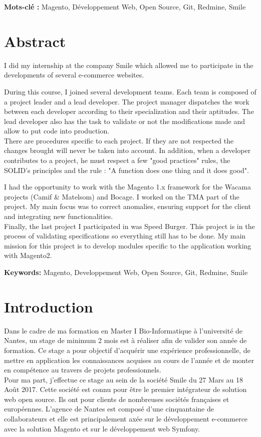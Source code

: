 \documentclass[12pt, a4paper, twoside]{report}
\newcommand{\mychapter}[2]{
	\setcounter{chapter}{#1}
	\setcounter{section}{0}
	\chapter*{#2}
	\addcontentsline{toc}{chapter}{#2}
}
\begin{document}
\textbf{Mots-clé :} Magento, Développement Web, Open Source, Git, Redmine, Smile

\mychapter{-3}{Abstract}

I did my internship at the company Smile which allowed me to participate in the developments of several e-commerce websites. \vspace{0.1cm}

During this course, I joined several development teams. Each team is composed of a project leader and a lead developer. The project manager dispatches the work between each developer according to their specialization and their aptitudes. The lead developer also has the task to validate or not the modifications made and allow to put code into production. \\
There are procedures specific to each project. If they are not respected the changes brought will never be taken into account. In addition, when a developer contributes to a project, he must respect a few "good practices" rules, the SOLID's principles and the rule : "A function does one thing and it does good". \vspace{0.1cm}

I had the opportunity to work with the Magento 1.x framework for the Wacama projects (Camif \& Matelsom) and Bocage. I worked on the TMA part of the project. My main focus was to correct anomalies, ensuring support for the client and integrating new functionalities. \\

Finally, the last project I participated in was Speed Burger. This project is in the process of validating specifications so everything still has to be done. My main mission for this project is to develop modules specific to the application working with Magento2. \vspace{0.1cm}

\textbf{Keywords:} Magento, Developpement Web, Open Source, Git, Redmine, Smile

\mychapter{-2}{Introduction}

Dans le cadre de ma formation en Master I Bio-Informatique à l'université de Nantes, un stage de minimum 2 mois est à réaliser afin de valider son année de formation. Ce stage a pour objectif d'acquérir une expérience professionnelle, de mettre en application les connaissances acquises au cours de l'année et de monter en compétence au travers de projets professionnels. \\

Pour ma part, j'effectue ce stage au sein de la société Smile du 27 Mars au 18 Août 2017. Cette société est connu pour être le premier intégrateur de solution web open source. Ils ont pour clients de nombreuses sociétés françaises et européennes. L’agence de Nantes est composé d’une cinquantaine de collaborateurs et elle est principalement axée sur le développement e-commerce avec la solution Magento et sur le développement web Symfony. \\
\end{document}
